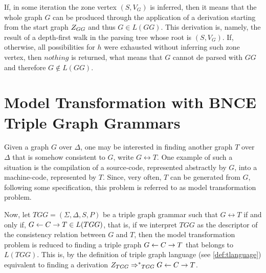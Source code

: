 \documentclass[]{report}
\begin{document}
If, in some iteration the zone vertex $(S, V_G)$ is inferred, then it means that the whole graph $G$ can be produced through the application of a derivation starting from the start graph $Z_{GG}$ and thus $G \in L(GG)$. This derivation is, namely, the result of a depth-first walk in the parsing tree whose root is $(S, V_G)$. If, otherwise, all possibilities for $h$ were exhausted without inferring such zone vertex, then $nothing$ is returned, what means that $G$ cannot de parsed with $GG$ and therefore $G \notin L(GG)$.





\section{Model Transformation with BNCE Triple Graph Grammars}
Given a graph $G$ over $\Delta$, one may be interested in finding another graph $T$ over $\Delta$ that is somehow consistent to $G$, write $G \rel T$. One example of such a situation is the compilation of a source-code, represented abstractly by $G$, into a machine-code, represented by $T$. Since, very often, $T$ can be generated from $G$, following some specification, this problem is referred to as model transformation problem.

Now, let $TGG = (\Sigma, \Delta, S, P)$ be a triple graph grammar such that $G \rel T$ if and only if, $G \overset{}{\leftarrow} C \overset{}{\rightarrow} T \in L(TGG)$, that is, if we interpret $TGG$ as the descriptor of the consistency relation between $G$ and $T$, then the model transformation problem is reduced to finding a triple graph $G \overset{}{\leftarrow} C \overset{}{\rightarrow} T$ that belongs to $L(TGG)$. This is, by the definition of triple graph language (see \ref{def:tlanguage}) equivalent to finding a derivation $\startTG{TGG} \tderivtr{}{}{TGG} G \ms{} C \mt{} T$.
\end{document}
